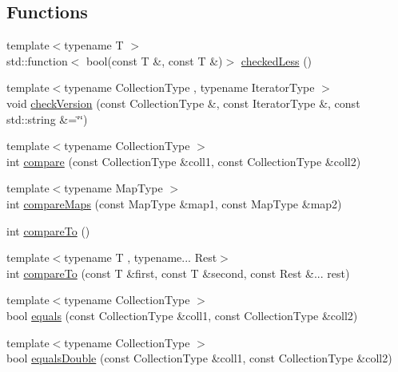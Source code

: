 \subsection*{Functions}
\begin{DoxyCompactItemize}
\item 
{\footnotesize template$<$typename T $>$ }\\std\+::function$<$ bool(const T \&, const T \&)$>$ \mbox{\hyperlink{namespacestanfordcpplib_1_1collections_a9bb653d00a8c6d39cb75101500d14425}{checked\+Less}} ()
\item 
{\footnotesize template$<$typename Collection\+Type , typename Iterator\+Type $>$ }\\void \mbox{\hyperlink{namespacestanfordcpplib_1_1collections_a91290b45c9efbe37b0c013fddfc8e4c4}{check\+Version}} (const Collection\+Type \&, const Iterator\+Type \&, const std\+::string \&=\char`\"{}\char`\"{})
\item 
{\footnotesize template$<$typename Collection\+Type $>$ }\\int \mbox{\hyperlink{namespacestanfordcpplib_1_1collections_a6d113dfaa3d28a3894990c64411ff03c}{compare}} (const Collection\+Type \&coll1, const Collection\+Type \&coll2)
\item 
{\footnotesize template$<$typename Map\+Type $>$ }\\int \mbox{\hyperlink{namespacestanfordcpplib_1_1collections_a1ed84a88db8dc524f50a355ef92bd7fb}{compare\+Maps}} (const Map\+Type \&map1, const Map\+Type \&map2)
\item 
int \mbox{\hyperlink{namespacestanfordcpplib_1_1collections_ab00507d6622f9c25b9d2f0bcc3436838}{compare\+To}} ()
\item 
{\footnotesize template$<$typename T , typename... Rest$>$ }\\int \mbox{\hyperlink{namespacestanfordcpplib_1_1collections_a46c6ffa61321942765bddb52b471352c}{compare\+To}} (const T \&first, const T \&second, const Rest \&... rest)
\item 
{\footnotesize template$<$typename Collection\+Type $>$ }\\bool \mbox{\hyperlink{namespacestanfordcpplib_1_1collections_a7ffc19787c4a86528a81d8a7b2d6d963}{equals}} (const Collection\+Type \&coll1, const Collection\+Type \&coll2)
\item 
{\footnotesize template$<$typename Collection\+Type $>$ }\\bool \mbox{\hyperlink{namespacestanfordcpplib_1_1collections_ae626c392f1fc8926386ed9e5c232524c}{equals\+Double}} (const Collection\+Type \&coll1, const Collection\+Type \&coll2)

\end{DoxyCompactItemize}
